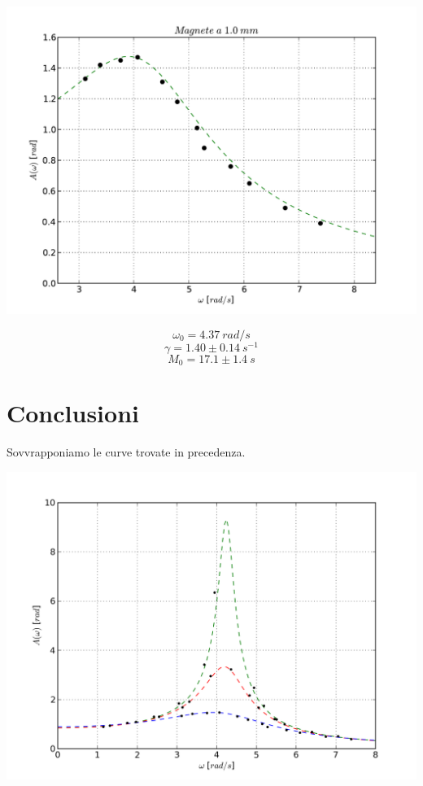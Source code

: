 \includegraphics[scale=0.75]{"../grafici/Magnetea10mm"}


$$ \omega_0 = 4.37\ rad/s $$
$$ \gamma = 1.40 \pm 0.14\ s^{-1}$$
$$ M_0 = 17.1 \pm 1.4\ s$$


\section{Conclusioni}
Sovvrapponiamo le curve trovate in precedenza.

\includegraphics[scale=0.9]{../grafici/risonanza}

